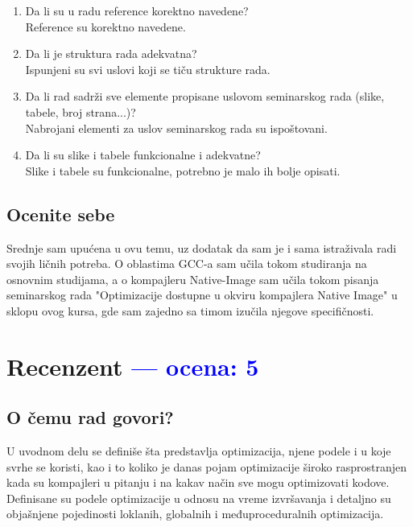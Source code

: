 \documentclass[a4paper]{report}
\newcommand{\odgovor}[1]{\textcolor{blue}{#1}}
\begin{document}
\begin{enumerate}
\item Da li su u radu reference korektno navedene?\\
Reference su korektno navedene.

\item Da li je struktura rada adekvatna?\\
Ispunjeni su svi uslovi koji se tiču strukture rada.

\item Da li rad sadrži sve elemente propisane uslovom seminarskog rada (slike, tabele, broj strana...)?\\
Nabrojani elementi za uslov seminarskog rada su ispoštovani.

\item Da li su slike i tabele funkcionalne i adekvatne?\\
Slike i tabele su funkcionalne, potrebno je malo ih bolje opisati.

\end{enumerate}

\section{Ocenite sebe}
Srednje sam upućena u ovu temu, uz dodatak da sam je i sama istraživala radi svojih ličnih potreba. O oblastima GCC-a sam učila tokom studiranja na osnovnim studijama, a o kompajleru Native-Image sam učila tokom pisanja seminarskog rada "Optimizacije dostupne u okviru kompajlera
Native Image" u sklopu ovog kursa, gde sam zajedno sa timom izučila njegove specifičnosti.

\chapter{Recenzent \odgovor{--- ocena: 5} }


\section{O čemu rad govori?}
U uvodnom delu se definiše šta predstavlja optimizacija, njene podele i u koje svrhe se koristi, kao i to koliko je danas pojam optimizacije široko rasprostranjen kada su kompajleri u pitanju i na kakav način sve mogu optimizovati kodove. Definisane su podele optimizacije u odnosu na vreme izvršavanja i detaljno su objašnjene pojedinosti loklanih, globalnih i međuproceduralnih optimizacija.
\end{document}
